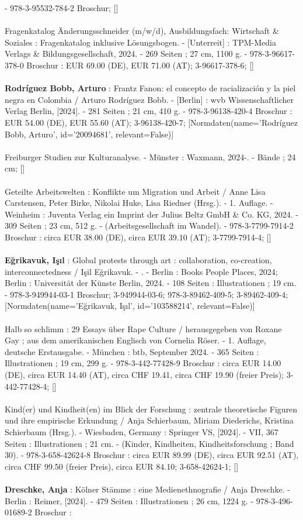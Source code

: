 \documentclass{article}
\begin{document}
\begin{multicols}{3}
- 978-3-95532-784-2 Broschur; []\\\\Fragenkatalog Änderungsschneider (m/w/d), Ausbildungsfach: Wirtschaft \& Soziales : Fragenkatalog inklusive Lösungsbogen. - [Unterreit] : TPM-Media Verlags \& Bildungsgesellschaft, 2024. - 269 Seiten ; 27 cm, 1100 g. - 978-3-96617-378-0 Broschur : EUR 69.00 (DE), EUR 71.00 (AT); 3-96617-378-6; []\\\\\textbf{Rodríguez Bobb, Arturo} : Frantz Fanon: el concepto de racialización y la piel negra en Colombia / Arturo Rodríguez Bobb. - [Berlin] : wvb Wissenschaftlicher Verlag Berlin, [2024]. - 281 Seiten ; 21 cm, 410 g. - 978-3-96138-420-4 Broschur : EUR 54.00 (DE), EUR 55.60 (AT); 3-96138-420-7; [Normdaten(name='Rodríguez Bobb, Arturo', id='20094681', relevant=False)]\\\\Freiburger Studien zur Kulturanalyse. - Münster : Waxmann, 2024-. - Bände ; 24 cm; []\\\\Geteilte Arbeitswelten : Konflikte um Migration und Arbeit / Anne Lisa Carstensen, Peter Birke, Nikolai Huke, Lisa Riedner (Hrsg.). - 1. Auflage. - Weinheim : Juventa Verlag ein Imprint der Julius Beltz GmbH \& Co. KG, 2024. - 309 Seiten ; 23 cm, 512 g. - (Arbeitsgesellschaft im Wandel). - 978-3-7799-7914-2 Broschur : circa EUR 38.00 (DE), circa EUR 39.10 (AT); 3-7799-7914-4; []\\\\\textbf{Eğrikavuk, Işıl} : Global protests through art : collaboration, co-creation, interconnectedness / Işil Eğrikavuk. - . - Berlin : Books People Places, 2024; Berlin : Universität der Künste Berlin, 2024. - 108 Seiten : Illustrationen ; 19 cm. - 978-3-949944-03-1 Broschur; 3-949944-03-6; 978-3-89462-409-5; 3-89462-409-4; [Normdaten(name='Eğrikavuk, Işıl', id='103588214', relevant=False)]\\\\Halb so schlimm : 29 Essays über Rape Culture / herausgegeben von Roxane Gay ; aus dem amerikanischen Englisch von Cornelia Röser. - 1. Auflage, deutsche Erstausgabe. - München : btb, September 2024. - 365 Seiten : Illustrationen ; 19 cm, 299 g. - 978-3-442-77428-9 Broschur : circa EUR 14.00 (DE), circa EUR 14.40 (AT), circa CHF 19.41, circa CHF 19.90 (freier Preis); 3-442-77428-4; []\\\\Kind(er) und Kindheit(en) im Blick der Forschung : zentrale theoretische Figuren und ihre empirische Erkundung / Anja Schierbaum, Miriam Diederichs, Kristina Schierbaum (Hrsg.). - Wiesbaden, Germany : Springer VS, [2024]. - VII, 367 Seiten : Illustrationen ; 21 cm. - (Kinder, Kindheiten, Kindheitsforschung ; Band 30). - 978-3-658-42624-8 Broschur : circa EUR 89.99 (DE), circa EUR 92.51 (AT), circa CHF 99.50 (freier Preis), circa EUR 84.10; 3-658-42624-1; []\\\\\textbf{Dreschke, Anja} : Kölner Stämme : eine Medienethnografie / Anja Dreschke. - Berlin : Reimer, [2024]. - 479 Seiten : Illustrationen ; 26 cm, 1224 g. - 978-3-496-01689-2 Broschur  : 
\end{multicols}
\end{document}
